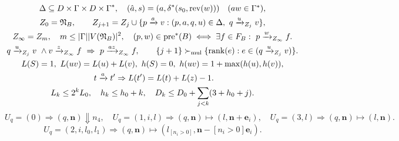\documentclass[10pt,letterpaper]{article}
\begin{document}
\begin{gather}
\Delta\subseteq D\times\Gamma\times D\times\Gamma^*,\quad
(\hat a,s)=(a,\delta^*(s_0,\mathrm{rev}(w)))\quad\textstyle (aw\in\Gamma^*),\\
Z_0=\mathfrak N_B,\qquad
Z_{j+1}=Z_j\cup\{p\xrightarrow{a}v:(p,a,q,u)\in\Delta,\ q\xrightarrow{u}_{Z_j}v\},\\
Z_\infty=Z_{m},\quad m\le|\Gamma||V(\mathfrak N_B)|^2,\quad
(p,w)\in{\rm pre}^*(B)\iff
 \exists f\in F_B:\ p\xrightarrow{w}_{Z_\infty} f .\\
 q\xrightarrow{u}_{Z_j}v\ \land v\xrightarrow{z}_{Z_\infty}f
 \ \Rightarrow\ p\xrightarrow{az}_{Z_\infty}f,\qquad
 \{j+1\}\succ_{\rm mul}\{\operatorname{rank}(e):e\in (q\xrightarrow{u}_{Z_j}v)\}.\\
\begin{gathered}
L(S)=1,\ L(uv)=L(u)+L(v),\
h(S)=0,\ h(uv)=1+\max(h(u),h(v)),\\\
t\xrightarrow{a}t'\Rightarrow L(t')=L(t)+L(z)-1.
\end{gathered}\\
L_k\le 2^kL_0,\quad h_k\le h_0+k,\quad
D_k\le D_0+\sum_{j<k}(3+h_0+j).
\end{gather}
\[
 U_q=(0)\Rightarrow(q,\mathbf n)\Downarrow n_4,\quad
 U_q=(1,i,l)\Rightarrow(q,\mathbf n)\mapsto(l,\mathbf n+\mathbf e_i),\quad
 U_q=(3,l)\Rightarrow(q,\mathbf n)\mapsto(l,\mathbf n).
\]
\[
 U_q=(2,i,l_0,l_1)\Rightarrow (q,\mathbf n)\mapsto
 \left(l_{[n_i>0]},\mathbf n-[n_i>0]\mathbf e_i\right).
\]




\end{document}
